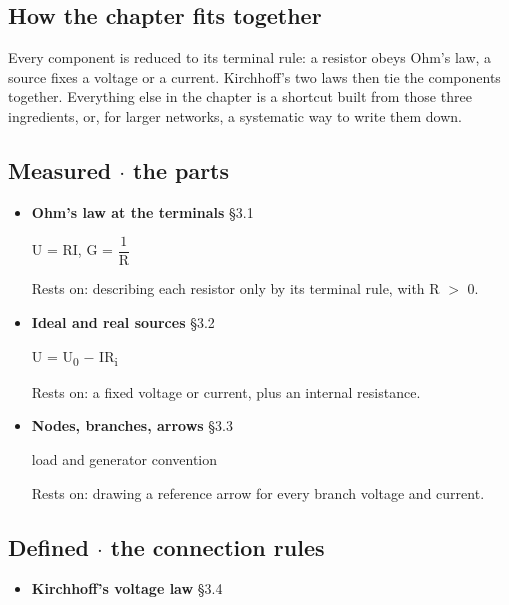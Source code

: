 \documentclass[11pt]{article}
\begin{document}
\begin{keepsection}
\section{How the chapter fits together}

Every component is reduced to its terminal rule: a resistor obeys Ohm’s law, a source fixes a voltage or a current. Kirchhoff’s two laws then tie the components together. Everything else in the chapter is a shortcut built from those three ingredients, or, for larger networks, a systematic way to write them down.

\subsection{Measured \ensuremath{\cdot} the parts}

\begin{itemize}
\item {}
\textbf{Ohm’s law at the terminals} \hfill{\small\color{FAUblue}§3.1}

U = RI, G = {\small\ensuremath{\dfrac{1}{\mathrm{R}}}}

Rests on: describing each resistor only by its terminal rule, with R \ensuremath{>} 0.
\item {}
\textbf{Ideal and real sources} \hfill{\small\color{FAUblue}§3.2}

U = U\textsubscript{0} \ensuremath{-} IR\textsubscript{i}

Rests on: a fixed voltage or current, plus an internal resistance.
\item {}
\textbf{Nodes, branches, arrows} \hfill{\small\color{FAUblue}§3.3}

load and generator convention

Rests on: drawing a reference arrow for every branch voltage and current.
\end{itemize}

\subsection{Defined \ensuremath{\cdot} the connection rules}

\begin{itemize}
\item {}
\textbf{Kirchhoff’s voltage law} \hfill{\small\color{FAUblue}§3.4}


\end{itemize}
\end{keepsection}
\end{document}
